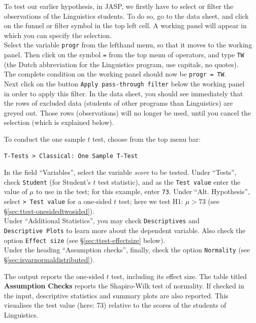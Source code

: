 \documentclass[
]{book}
\begin{document}
To test our earlier hypothesis, in JASP, we firstly have
to select or filter the observations of the Linguistics students. To do so, go to the data sheet, and click on the funnel or filter symbol in the top left cell. A working panel will appear in which you can specify the selection.\\
Select the variable \texttt{progr} from the lefthand menu, so that it moves to the working panel. Then click on the symbol \texttt{=} from the top menu of operators, and type \texttt{TW} (the Dutch abbreviation for the Linguistics program, use capitals, no quotes). The complete condition on the working panel should now be \texttt{progr\ =\ TW}.\\
Next click on the button \texttt{Apply\ pass-through\ filter} below the working panel in order to apply this filter. In the data sheet, you should see immediately that the rows of excluded data (students of other programs than Linguistics) are greyed out. Those rows (observations) will no longer be used, until you cancel the selection (which is explained below).

To conduct the one sample \(t\) test, choose from the top menu bar:

\begin{verbatim}
T-Tests > Classical: One Sample T-Test
\end{verbatim}

In the field ``Variables'', select the variable \emph{score} to be tested.
Under ``Tests'', check \texttt{Student} (for Student's \(t\) test statistic), and as the \texttt{Test\ value} enter the value of \(\mu\) to use in the test; for this example, enter \texttt{73}. Under ``Alt. Hypothesis'', select \texttt{\textgreater{}\ Test\ value} for a one-sided \(t\) test; here we test H1: \(\mu>73\) (see §\ref{sec:ttest-onesidedtwosided}).\\
Under ``Additional Statistics'', you may check \texttt{Descriptives} and \texttt{Descriptive\ Plots} to learn more about the dependent variable. Also check the option \texttt{Effect\ size} (see §\ref{sec:ttest-effectsize} below).\\
Under the heading ``Assumption checks'', finally, check the option \texttt{Normality} (see §\ref{sec:isvarnormaldistributed}).

The output reports the one-sided \(t\) test, including its effect size.
The table titled \textbf{Assumption Checks} reports the Shapiro-Wilk test of normality. If checked in the input, descriptive statistics and summary plots are also reported. This visualises the test value (here: 73) relative to the scores of the students of Linguistics.
\end{document}
